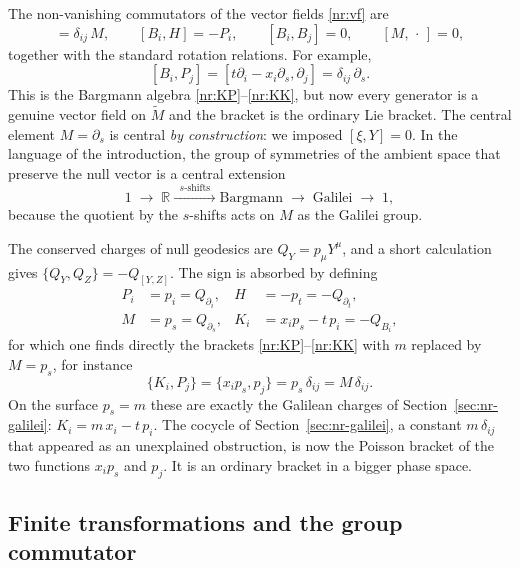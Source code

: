 The non-vanishing commutators of the vector fields \eqref{nr:vf} are
\begin{equation}
  [B_i,P_j]=\delta_{ij}\,M,\qquad [B_i,H]=-P_i,\qquad
  [B_i,B_j]=0,\qquad [M,\,\cdot\,]=0,
  \label{nr:vfalgebra}
\end{equation}
together with the standard rotation relations. For example,
\[
  [B_i,P_j]=[t\partial_i-x_i\partial_s,\partial_j]=\delta_{ij}\,\partial_s .
\]
This is the Bargmann algebra \eqref{nr:KP}--\eqref{nr:KK}, but now every
generator is a genuine vector field on $\tilde M$ and the bracket is the
ordinary Lie bracket. The central element $M=\partial_s$ is central
\emph{by construction}: we imposed $[\xi,Y]=0$. In the language of the
introduction, the group of symmetries of the ambient space that preserve the
null vector is a central extension
\begin{equation}
  1\;\longrightarrow\;\mathbb{R}\xrightarrow{\;\;s\text{-shifts}\;\;}
  \text{Bargmann}\;\longrightarrow\;\text{Galilei}\;\longrightarrow\;1 ,
  \label{nr:exact}
\end{equation}
because the quotient by the $s$-shifts acts on $M$ as the Galilei group.

The conserved charges of null geodesics are $Q_Y=p_\mu Y^\mu$, and a short
calculation gives $\{Q_Y,Q_Z\}=-Q_{[Y,Z]}$. The sign is absorbed by defining
\begin{align*}
  P_i&=p_i=Q_{\partial_i}, & H&=-p_t=-Q_{\partial_t},\\
  M&=p_s=Q_{\partial_s}, & K_i&=x_ip_s-t\,p_i=-Q_{B_i},
\end{align*}
for which one finds directly the brackets \eqref{nr:KP}--\eqref{nr:KK} with
$m$ replaced by $M=p_s$, for instance
\[
  \{K_i,P_j\}=\{x_ip_s,p_j\}=p_s\,\delta_{ij}=M\,\delta_{ij}.
\]
On the surface $p_s=m$ these are exactly the Galilean charges of
Section~\ref{sec:nr-galilei}: $K_i=m\,x_i-t\,p_i$. The cocycle of
Section~\ref{sec:nr-galilei}, a constant $m\,\delta_{ij}$ that appeared as an
unexplained obstruction, is now the Poisson bracket of the two functions
$x_ip_s$ and $p_j$. It is an ordinary bracket in a bigger phase space.

\subsection{Finite transformations and the group commutator}

